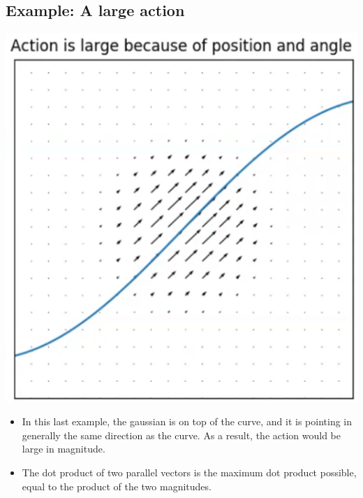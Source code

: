 \documentclass[10pt]{article}
\begin{document}
\subsection*{Example: A large action}
\begin{center}
    \includegraphics*[scale=0.6]{W3_6.png}
\end{center}
\begin{itemize}
    \item In this last example, the gaussian is on top of the curve, and it is pointing in generally the same direction as the curve.  As a result, the action would be large in magnitude.
    \item The dot product of two parallel vectors is the maximum dot product possible, equal to the product of the two magnitudes.
\end{itemize}
\end{document}
